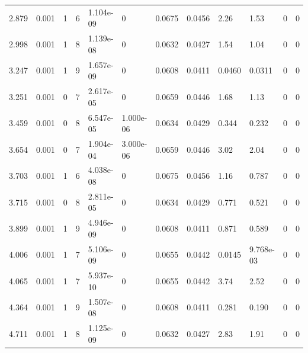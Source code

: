 \documentclass[preview]{standalone}
\begin{document}
{{\begin{tabular}{L{1.2cm}C{1.2cm} C{0.3cm}C{0.5cm} C{1.4cm}C{1.4cm} C{1.4cm}C{1.4cm} C{1.6cm}C{1.6cm} C{1.6cm}C{1.6cm}}
  2.879  &  0.001  & 1     &  6 &  1.104e-09  & 0  &  0.0675&   0.0456& 2.26 & 1.53   &  0 & 0  \\ 
  2.998  &  0.001  & 1     &  8 &  1.139e-08  & 0  &  0.0632&   0.0427& 1.54 & 1.04   &  0 & 0  \\ 
  3.247  &  0.001  & 1     &  9 &  1.657e-09  & 0  &  0.0608&   0.0411& 0.0460 & 0.0311   &  0 & 0  \\ 
  3.251  &  0.001  & 0     &  7 &  2.617e-05  & 0  &  0.0659&   0.0446& 1.68 & 1.13   &  0 & 0  \\ 
  3.459  &  0.001  & 0     &  8 &  6.547e-05  & 1.000e-06  &  0.0634&   0.0429& 0.344 & 0.232   &  0 & 0  \\ 
  3.654  &  0.001  & 0     &  7 &  1.904e-04  & 3.000e-06  &  0.0659&   0.0446& 3.02 & 2.04   &  0 & 0  \\ 
  3.703  &  0.001  & 1     &  6 &  4.038e-08  & 0  &  0.0675&   0.0456& 1.16 & 0.787   &  0 & 0  \\ 
  3.715  &  0.001  & 0     &  8 &  2.811e-05  & 0  &  0.0634&   0.0429& 0.771 & 0.521   &  0 & 0  \\ 
  3.899  &  0.001  & 1     &  9 &  4.946e-09  & 0  &  0.0608&   0.0411& 0.871 & 0.589   &  0 & 0  \\ 
  4.006  &  0.001  & 1     &  7 &  5.106e-09  & 0  &  0.0655&   0.0442& 0.0145 & 9.768e-03   &  0 & 0  \\ 
  4.065  &  0.001  & 1     &  7 &  5.937e-10  & 0  &  0.0655&   0.0442& 3.74 & 2.52   &  0 & 0  \\ 
  4.364  &  0.001  & 1     &  9 &  1.507e-08  & 0  &  0.0608&   0.0411& 0.281 & 0.190   &  0 & 0  \\ 
  4.711  &  0.001  & 1     &  8 &  1.125e-09  & 0  &  0.0632&   0.0427& 2.83 & 1.91   &  0 & 0  \\ 
\hline 
\end{tabular} 

}}
\end{document}
